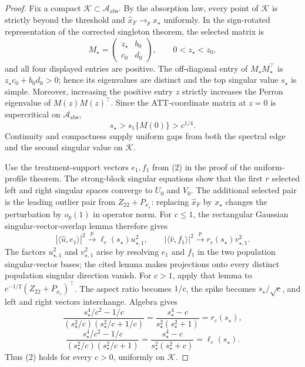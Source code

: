 \documentclass{article}
\begin{document}
\begin{proof}
Fix a compact \(\mathcal K\subset\mathcal A_{\mathrm{abs}}\).  By the absorption law, every point of \(\mathcal K\) is strictly beyond the threshold and \(\widehat x_F\to_p x_\star\) uniformly.  In the sign-rotated representation of the corrected singleton theorem, the selected matrix is
\[
 M_\star=\begin{pmatrix}z_\star&b_0\\c_0&d_0\end{pmatrix},
 \qquad 0<z_\star<z_0,
\]
and all four displayed entries are positive.  The off-diagonal entry of \(M_\star M_\star^{\top}\) is \(z_\star c_0+b_0d_0>0\); hence its eigenvalues are distinct and the top singular value \(s_\star\) is simple.  Moreover, increasing the positive entry \(z\) strictly increases the Perron eigenvalue of \(M(z)M(z)^{\top}\).  Since the ATT-coordinate matrix at \(z=0\) is supercritical on \(\mathcal A_{\mathrm{abs}}\),
\[
 s_\star>s_1\{M(0)\}>c^{1/4}. \tag{1}
\]
Continuity and compactness supply uniform gaps from both the spectral edge and the second singular value on \(\mathcal K\).

Use the treatment-support vectors \(e_1,f_1\) from (2) in the proof of the uniform-profile theorem.  The strong-block singular equations show that the first \(r\) selected left and right singular spaces converge to \(U_0\) and \(V_0\).  The additional selected pair is the leading outlier pair from \(Z_{22}+P_{x_\star}\): replacing \(\widehat x_F\) by \(x_\star\) changes the perturbation by \(o_p(1)\) in operator norm.  For \(c\leq1\), the rectangular Gaussian singular-vector-overlap lemma therefore gives
\[
 |\langle\widehat u,e_1\rangle|^2
 \xrightarrow{p}\ell_c(s_\star)u_{\star,1}^2,
 \qquad
 |\langle\widehat v,f_1\rangle|^2
 \xrightarrow{p}r_c(s_\star)v_{\star,1}^2. \tag{2}
\]
The factors \(u_{\star,1}^2\) and \(v_{\star,1}^2\) arise by resolving \(e_1\) and \(f_1\) in the two population singular-vector bases; the cited lemma makes projections onto every distinct population singular direction vanish.  For \(c>1\), apply that lemma to \(c^{-1/2}(Z_{22}+P_{x_\star})^{\top}\).  The aspect ratio becomes \(1/c\), the spike becomes \(s_\star/\sqrt c\), and left and right vectors interchange.  Algebra gives
\[
 \frac{s_\star^4/c^2-1/c}{(s_\star^2/c)(s_\star^2/c+1/c)}
 =\frac{s_\star^4-c}{s_\star^2(s_\star^2+1)}=r_c(s_\star),
\]
\[
 \frac{s_\star^4/c^2-1/c}{(s_\star^2/c)(s_\star^2/c+1)}
 =\frac{s_\star^4-c}{s_\star^2(s_\star^2+c)}=\ell_c(s_\star). \tag{3}
\]
Thus (2) holds for every \(c>0\), uniformly on \(\mathcal K\).


\end{proof}
\end{document}
